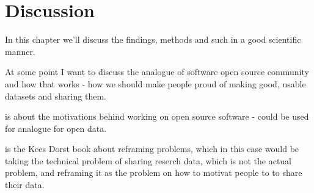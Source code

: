\chapter{Discussion}
\label{chapter:discussion}

In this chapter we'll discuss the findings, methods and such in a good
scientific manner.

At some point I want to discuss the analogue of software open source community
and how that works - how we should make people proud of making good, usable
datasets and sharing them.

\cite{DBLP:conf/hicss/HarsO01} is about the motivations behind working on open
source software - could be used for analogue for open data.

\cite{dorst2015frame} is the Kees Dorst book about reframing problems, which in
this case would be taking the technical problem of sharing reserch data, which
is not the actual problem, and reframing it as the problem on how to motivat
people to to share their data.
